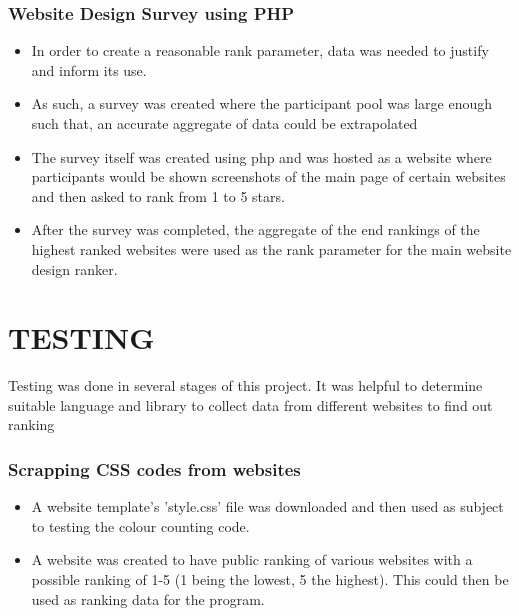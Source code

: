\documentclass{fisatproject}
\begin{document}
	\subsection{Website Design Survey using PHP}
	\begin{itemize}
		\item In order to create a reasonable rank parameter, data was needed to justify and inform its use.
		\item As such, a survey was created where the participant pool was large enough such that, an accurate aggregate of data could be extrapolated
		\item The survey itself was created using php and was hosted as a website where participants would be shown screenshots of the main page of certain websites and then asked to rank from 1 to 5 stars.
		\item After the survey was completed, the aggregate of the end rankings of the highest ranked websites were used as the rank parameter for the main website design ranker.
	\end{itemize}	
\chapter{TESTING}

	Testing was done in several stages of this project. It was helpful to determine suitable language and library to collect data from different websites to find out ranking\\
	\subsection{Scrapping CSS codes from websites}
\begin{itemize}
	\item A website template's 'style.css' file was downloaded and then used as subject to testing the colour counting code.
	\item A website was created to have public ranking of various websites with a possible ranking of 1-5 (1 being the lowest, 5 the highest). This could then be used as ranking data for the program.
\end{itemize}
\end{document}
